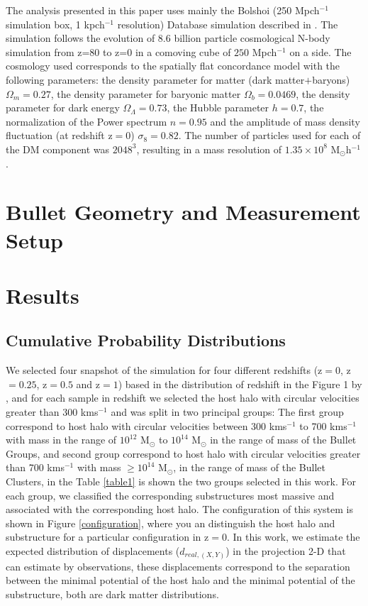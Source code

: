 \documentclass{emulateapj}
\begin{document}
The analysis presented in this paper uses mainly the Bolshoi (250
Mpch$^{-1}$ simulation box, 1 kpch$^{-1}$ resolution) Database
simulation described in \citet{2011ApJ...740..102K}. The simulation
follows the evolution of 8.6 billion particle cosmological N-body
simulation from z=80 to z=0 in a comoving cube of $250$ Mpch$^{-1}$
on a side. The cosmology used  corresponds to  the spatially flat
concordance model with the following parameters:  the density
parameter for matter (dark matter$+$baryons) $\Omega_m=0.27$, the
density parameter for baryonic matter  $\Omega_b=0.0469$, the density
parameter for dark energy $\Omega_{\Lambda}=0.73$, the Hubble
parameter $h=0.7$, the 
normalization of the Power spectrum $n=0.95$ and the amplitude of mass
density fluctuation (at redshift z$=$0) $\sigma_8=0.82$.  The number
of particles used for each of the DM component was $2048^3$, resulting
in a mass resolution of $1.35 \times 10^8$ M$_{\odot}$h$^{-1}$.   

\section{Bullet Geometry and Measurement Setup}
\label{sec:setup}


\section{Results}
\label{sec:results}

\subsection{Cumulative Probability Distributions}
\label{cumulative_distribution}

We selected four snapshot of the simulation for four different
redshifts (z$=0$, z$=0.25$, z$=0.5$ and z$=1$) based in the
distribution of redshift in the Figure 1 by \citet{verdugo}, and  for
each sample in redshift we selected the host halo with circular
velocities greater than 300 kms$^{-1}$ and was split in two  principal
groups: The first group correspond to host halo with circular
velocities between 300 kms$^{-1}$ to 700 kms${^{-1}}$ with mass in the
range of $10^{12}$ M$_\odot{}$ to $10^{14}$ M$_\odot{}$ in the range
of mass of the Bullet Groups, and second group correspond to host halo
with circular velocities greater than 700 kms$^{-1}$ with mass
$\geq10^{14}$ M$_\odot{}$, in the range of mass of the Bullet
Clusters, in  the Table \ref{table1} is shown the two groups selected
in this work. For each group, we  classified the corresponding
substructures most massive and associated with the corresponding host
halo. The configuration of this system is shown in  Figure
\ref{configuration}, where you  an distinguish the host halo and
substructure for a particular configuration in z$=0$. In  this work,
we estimate the expected distribution of displacements
($d_{real,(X,Y)}$) in the projection 2-D that can estimate by
observations, these displacements correspond to the separation between
the minimal potential of the host halo and the  minimal potential of
the substructure, both are dark matter distributions. 
\end{document}

